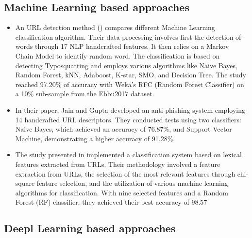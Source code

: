 \documentclass{article}
\begin{document}
    \subsection{Machine Learning based approaches}\label{subsec:machine-learning-based-approaches}

    \begin{itemize}

        \item An URL detection method (\cite{PhishingURLDetection}) compares different Machine Learning classification algorithm.
        Their data processing involves first the detection of words through 17 NLP handcrafted features.
        It then relies on a Markov Chain Model to identify random word.
        The classification is based on detecting Typosquatting and employs various algorithms like Naive Bayes, Random Forest, kNN, Adaboost, K-star, SMO, and Decision Tree.
        The study reached 97.20\% of accuracy with Weka's RFC (Random Forest Classifier) on a 10\% sub-sample from the Ebbu2017 dataset.

        \item In their paper\cite{PhishSafe}, Jain and Gupta developed an anti-phishing system employing 14 handcrafted URL descriptors.
        They conducted tests using two classifiers: Naive Bayes, which achieved an accuracy of 76.87\%, and Support Vector Machine, demonstrating a higher accuracy of 91.28\%.

        \item The study presented in\cite{LexicalFeatureSelection} implemented a classification system based on lexical features extracted from URLs. Their methodology involved a feature extraction from URLs, the selection of the most relevant features through chi-square feature selection, and the utilization of various machine learning algorithms for classification.
        With nine selected features and a Random Forest (RF) classifier, they achieved their best accuracy of 98.57%

    \end{itemize}

    \subsection{Deepl Learning based approaches}\label{subsec:deepl-learning-based-approaches}
\end{document}
